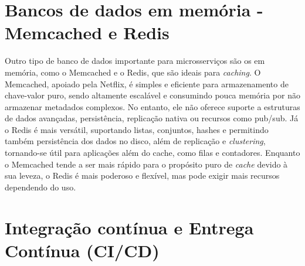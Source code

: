 \section{Bancos de dados em memória - Memcached e Redis}
Outro tipo de banco de dados importante para microsserviços são os em memória, como o Memcached e o Redis, que são ideais para \emph{caching}. O Memcached, apoiado pela Netflix, é simples e eficiente para armazenamento de chave-valor puro, sendo altamente escalável e consumindo pouca memória por não armazenar metadados complexos. No entanto, ele não oferece suporte a estruturas de dados avançadas, persistência, replicação nativa ou recursos como pub/sub. Já o Redis é mais versátil, suportando listas, conjuntos, hashes e permitindo também persistência dos dados no disco, além de replicação e \emph{clustering}, tornando-se útil para aplicações além do cache, como filas e contadores. Enquanto o Memcached tende a ser mais rápido para o propósito puro de \emph{cache} devido à sua leveza, o Redis é mais poderoso e flexível, mas pode exigir mais recursos dependendo do uso. \cite{memcached,redis}




\section{Integração contínua e Entrega Contínua (CI/CD)}




